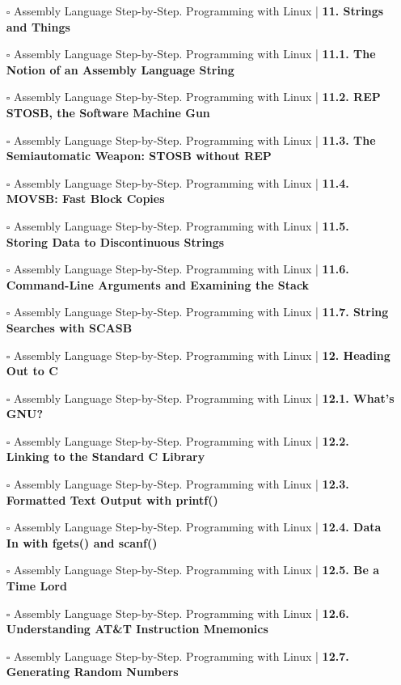 \documentclass[a4, landscape, 12pt]{article}
\newcommand{\checkbox}{$\square$}%
\begin{document}
\begin{itemize}
{}
\item [\checkbox]  Assembly Language Step-by-Step. Programming with Linux | \textbf{ 11. Strings and Things
}
\item [\checkbox]  Assembly Language Step-by-Step. Programming with Linux | \textbf{ 11.1. The Notion of an Assembly Language String
}
\item [\checkbox]  Assembly Language Step-by-Step. Programming with Linux | \textbf{ 11.2. REP STOSB, the Software Machine Gun
}
\item [\checkbox]  Assembly Language Step-by-Step. Programming with Linux | \textbf{ 11.3. The Semiautomatic Weapon: STOSB without REP
}
\item [\checkbox]  Assembly Language Step-by-Step. Programming with Linux | \textbf{ 11.4. MOVSB: Fast Block Copies
}
\item [\checkbox]  Assembly Language Step-by-Step. Programming with Linux | \textbf{ 11.5. Storing Data to Discontinuous Strings
}
\item [\checkbox]  Assembly Language Step-by-Step. Programming with Linux | \textbf{ 11.6. Command-Line Arguments and Examining the Stack
}
\item [\checkbox]  Assembly Language Step-by-Step. Programming with Linux | \textbf{ 11.7. String Searches with SCASB
}
\item [\checkbox]  Assembly Language Step-by-Step. Programming with Linux | \textbf{ 12. Heading Out to C
}
\item [\checkbox]  Assembly Language Step-by-Step. Programming with Linux | \textbf{ 12.1. What's GNU?
}
\item [\checkbox]  Assembly Language Step-by-Step. Programming with Linux | \textbf{ 12.2. Linking to the Standard C Library
}
\item [\checkbox]  Assembly Language Step-by-Step. Programming with Linux | \textbf{ 12.3. Formatted Text Output with printf()
}
\item [\checkbox]  Assembly Language Step-by-Step. Programming with Linux | \textbf{ 12.4. Data In with fgets() and scanf()
}
\item [\checkbox]  Assembly Language Step-by-Step. Programming with Linux | \textbf{ 12.5. Be a Time Lord
}
\item [\checkbox]  Assembly Language Step-by-Step. Programming with Linux | \textbf{ 12.6. Understanding AT&T Instruction Mnemonics
}
\item [\checkbox]  Assembly Language Step-by-Step. Programming with Linux | \textbf{ 12.7. Generating Random Numbers
}
\end{itemize}
\end{document}
